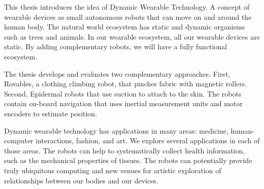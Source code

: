 \begin{abstractpage}
This thesis introduces the idea of Dynamic Wearable Technology. A concept of wearable devices as small autonomous robots that can move on and around the human body. The natural world ecosystem has static and dynamic organisms such as trees and animals. In our wearable ecosystem, all our wearable devices are static. By adding complementary robots, we will have a fully functional ecosystem. 

The thesis develops and evaluates two complementary approaches. First, Rovables, a clothing climbing robot, that pinches fabric with magnetic rollers. Second, Epidermal robots that use suction to attach to the skin. The robots contain on-board navigation that uses inertial measurement units and motor encoders to estimate position. 

Dynamic wearable technology has applications in many areas: medicine, human-computer interactions, fashion, and art. We explore several applications in each of those areas. The robots can help to systematically collect health information, such as the mechanical properties of tissues. The robots can potentially provide truly ubiquitous computing and new venues for artistic exploration of relationships between our bodies and our devices. 




\end{abstractpage}


